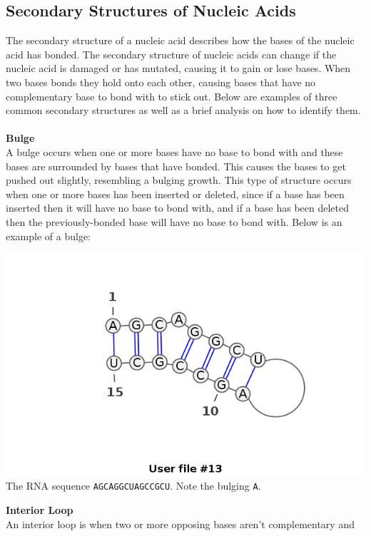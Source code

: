 

\subsection{Secondary Structures of Nucleic Acids}\label{structs}
The secondary structure of a nucleic acid describes how the bases of the 
nucleic acid has bonded. The secondary structure of nucleic acids can change if 
the nucleic acid is damaged or has mutated, causing it to gain or lose 
bases. When two bases bonds they hold onto each other, causing bases that 
have no complementary base to bond with to stick out. Below are examples of three 
common secondary structures as well as a brief analysis on how to identify them.\\\\
\textbf{Bulge}\\ 
A bulge occurs when one or more bases have no base to bond with and these 
bases are surrounded by bases that have bonded. This causes the bases to get 
pushed out slightly, resembling a bulging growth. This type of structure occurs 
when one or more bases has been inserted or deleted, since if a base has been 
inserted then it will have no base to bond with, and if a base has been deleted 
then the previously-bonded base will have no base to bond with. 
Below is an example of a bulge:
\begin{myex}\centering
\centering
\includegraphics[scale=0.4]{./lib/bulge.png}\\
The RNA sequence {\tt AGCAGGCUAGCCGCU}. Note the bulging {\tt A}.
\end{myex}
\textbf{Interior Loop}\\
An interior loop is when two or more opposing bases aren't complementary and 
